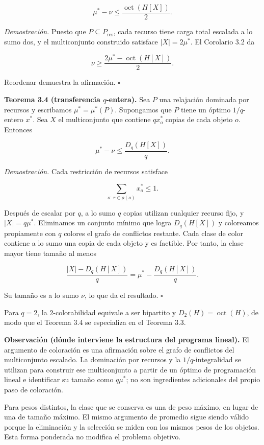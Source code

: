 \documentclass[spanish,11pt,a4paper]{article}
\begin{document}
\[
\mu^*-\nu
\le
\frac{\operatorname{oct}(H[X])}{2}.
\]

\emph{Demostración.} Puesto que \(P\subseteq P_{\mathrm{res}}\), cada
recurso tiene carga total escalada a lo sumo dos, y el multiconjunto
construido satisface \(|X|=2\mu^*\). El Corolario 3.2 da

\[
\nu
\ge
\frac{2\mu^*-\operatorname{oct}(H[X])}{2}.
\]

Reordenar demuestra la afirmación. \(\square\)

\textbf{Teorema 3.4 (transferencia \(q\)-entera).} Sea \(P\) una
relajación dominada por recursos y escribamos \(\mu^*=\mu^*(P)\).
Supongamos que \(P\) tiene un óptimo \(1/q\)-entero \(x^*\). Sea \(X\)
el multiconjunto que contiene \(qx_o^*\) copias de cada objeto \(o\).
Entonces

\[
\mu^*-\nu
\le
\frac{D_q(H[X])}{q}.
\]

\emph{Demostración.} Cada restricción de recursos satisface

\[
\sum_{o:\,r\in\rho(o)}x_o^*\le1.
\]

Después de escalar por \(q\), a lo sumo \(q\) copias utilizan cualquier
recurso fijo, y \(|X|=q\mu^*\). Eliminamos un conjunto mínimo que logra
\(D_q(H[X])\) y coloreamos propiamente con \(q\) colores el grafo de
conflictos restante. Cada clase de color contiene a lo sumo una copia de
cada objeto y es factible. Por tanto, la clase mayor tiene tamaño al
menos

\[
\frac{|X|-D_q(H[X])}{q}
=
\mu^*-\frac{D_q(H[X])}{q}.
\]

Su tamaño es a lo sumo \(\nu\), lo que da el resultado. \(\square\)

Para \(q=2\), la \(2\)-colorabilidad equivale a ser bipartito y
\(D_2(H)=\operatorname{oct}(H)\), de modo que el Teorema 3.4 se
especializa en el Teorema 3.3.

\textbf{Observación (dónde interviene la estructura del programa
lineal).} El argumento de coloración es una afirmación sobre el grafo de
conflictos del multiconjunto escalado. La dominación por recursos y la
\(1/q\)-integralidad se utilizan para construir ese multiconjunto a
partir de un óptimo de programación lineal e identificar su tamaño como
\(q\mu^*\); no son ingredientes adicionales del propio paso de
coloración.

Para pesos distintos, la clase que se conserva es una de peso máximo, en
lugar de una de tamaño máximo. El mismo argumento de promedio sigue
siendo válido porque la eliminación y la selección se miden con los
mismos pesos de los objetos. Esta forma ponderada no modifica el
problema objetivo.
\end{document}
